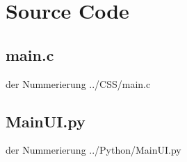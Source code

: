 \chapter{Source Code}
\label{appendixSoureCode}

\newpage
\section{main.c}
%
 der Nummerierung 
		{../CSS/main.c} %



\newpage
\section{MainUI.py}
%
 der Nummerierung 
		{../Python/MainUI.py} %
